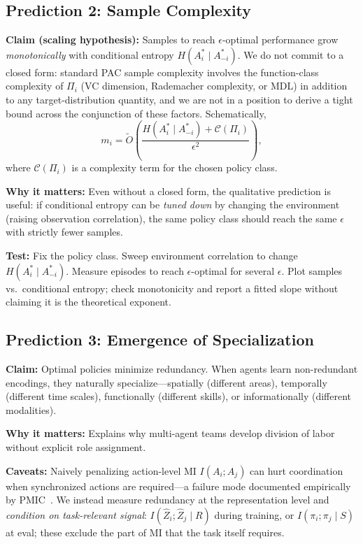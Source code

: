 \documentclass[10pt, letterpaper]{article}
\begin{document}
\subsection{Prediction 2: Sample Complexity}
\label{pred:sample-complexity}

\textbf{Claim (scaling hypothesis):} Samples to reach $\epsilon$-optimal performance grow \emph{monotonically} with conditional entropy $H(A_i^* \mid A_{-i}^*)$. We do not commit to a closed form: standard PAC sample complexity involves the function-class complexity of $\Pi_i$ (VC dimension, Rademacher complexity, or MDL) in addition to any target-distribution quantity, and we are not in a position to derive a tight bound across the conjunction of these factors. Schematically,
\[m_i = \tilde{O}\!\left(\frac{H(A_i^* \mid A_{-i}^*) + \mathcal{C}(\Pi_i)}{\epsilon^2}\right),\]
where $\mathcal{C}(\Pi_i)$ is a complexity term for the chosen policy class.

\textbf{Why it matters:} Even without a closed form, the qualitative prediction is useful: if conditional entropy can be \emph{tuned down} by changing the environment (raising observation correlation), the same policy class should reach the same $\epsilon$ with strictly fewer samples.

\textbf{Test:} Fix the policy class. Sweep environment correlation to change $H(A_i^* \mid A_{-i}^*)$. Measure episodes to reach $\epsilon$-optimal for several $\epsilon$. Plot samples vs.\ conditional entropy; check monotonicity and report a fitted slope without claiming it is the theoretical exponent.

\subsection{Prediction 3: Emergence of Specialization}
\label{pred:specialization}

\textbf{Claim:} Optimal policies minimize redundancy. When agents learn non-redundant encodings, they naturally specialize---spatially (different areas), temporally (different time scales), functionally (different skills), or informationally (different modalities).

\textbf{Why it matters:} Explains why multi-agent teams develop division of labor without explicit role assignment.

\textbf{Caveats:} Naively penalizing action-level MI $I(A_i; A_j)$ can hurt coordination when synchronized actions are required---a failure mode documented empirically by PMIC~\cite{li2022pmic}. We instead measure redundancy at the representation level and \emph{condition on task-relevant signal}: $I(\hat{Z}_i; \hat{Z}_j \mid R)$ during training, or $I(\pi_i; \pi_j \mid S)$ at eval; these exclude the part of MI that the task itself requires.
\end{document}
